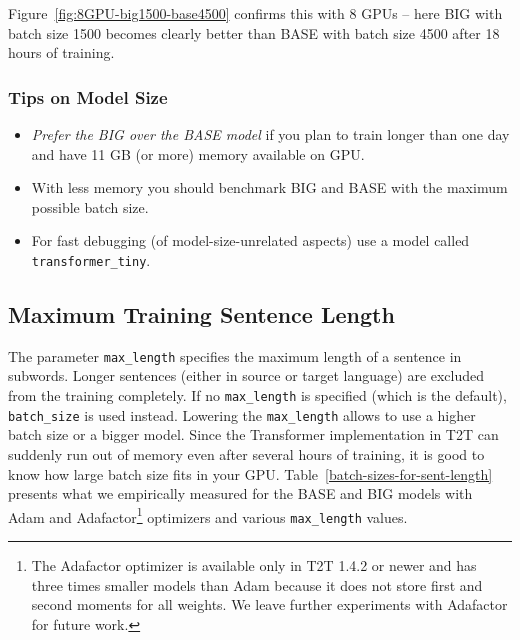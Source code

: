 \documentclass{pbmlarxiv} \pdfoutput=1
\def\recommend#1{\textsl{#1}}
\def\Tref#1{Table~\ref{#1}}
\begin{document}
Figure~\ref{fig:8GPU-big1500-base4500} confirms this with 8 GPUs
 -- here BIG with batch size 1500 becomes clearly better than BASE with batch size 4500
 after 18 hours of training.

\subsubsection*{Tips on Model Size}
\begin{itemize}
\item \recommend{Prefer the BIG over the BASE model}
 if you plan to train longer than one day and have 11 GB (or more) memory available on GPU.
\item With less memory you should benchmark BIG and BASE with the maximum possible batch size.
\item For fast debugging (of model-size-unrelated aspects) use a model called \texttt{trans\-for\-mer\_ti\-ny}.
\end{itemize}


\subsection{Maximum Training Sentence Length}\label{sec:max-len}
The parameter \verb|max_length| specifies the maximum length of a sentence in subwords.
Longer sentences (either in source or target language) are excluded from the training completely.
If no \verb|max_length| is specified (which is the default),
 \verb|batch_size| is used instead.
Lowering the \verb|max_length| allows to use a higher batch size or a bigger model.
Since the Transformer implementation in T2T can suddenly run out of memory
 even after several hours of training,
 it is good to know how large batch size fits in your GPU.
\Tref{batch-sizes-for-sent-length} presents what we empirically measured for the BASE and BIG
 models with Adam and Adafactor\footnote{
  The Adafactor optimizer \citep{adafactor} is available only in T2T 1.4.2 or newer and
   has three times smaller models than Adam
   because it does not store first and second moments for all weights.
  We leave further experiments with Adafactor for future work.
 } optimizers and various \verb|max_length| values.
\end{document}
